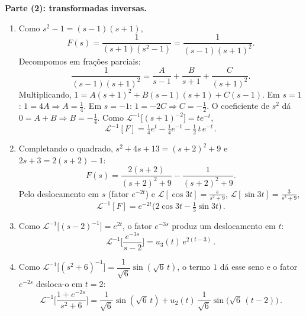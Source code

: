 \medskip
\noindent\textbf{Parte (2): transformadas inversas.}
\begin{enumerate}[label=(\alph*)]

\item Como $s^2-1=(s-1)(s+1)$,
\[
F(s)=\frac{1}{(s+1)(s^2-1)}=\frac{1}{(s-1)(s+1)^2}.
\]
Decompomos em frações parciais:
\[
\frac{1}{(s-1)(s+1)^2}=\frac{A}{s-1}+\frac{B}{s+1}+\frac{C}{(s+1)^2}.
\]
Multiplicando, $1=A(s+1)^2+B(s-1)(s+1)+C(s-1)$. Em $s=1$: $1=4A\Rightarrow A=\tfrac14$. Em $s=-1$: $1=-2C\Rightarrow C=-\tfrac12$. O coeficiente de $s^2$ dá $0=A+B\Rightarrow B=-\tfrac14$. Como $\mathcal{L}^{-1}\big[(s+1)^{-2}\big]=t e^{-t}$,
\[
\mathcal{L}^{-1}[F]=\boxed{\tfrac14 e^{t}-\tfrac14 e^{-t}-\tfrac12\,t\,e^{-t}}\,.
\]

\item Completando o quadrado, $s^2+4s+13=(s+2)^2+9$ e $2s+3=2(s+2)-1$:
\[
F(s)=\frac{2(s+2)}{(s+2)^2+9}-\frac{1}{(s+2)^2+9}.
\]
Pelo deslocamento em $s$ (fator $e^{-2t}$) e $\mathcal{L}[\cos 3t]=\tfrac{s}{s^2+9}$, $\mathcal{L}[\sin 3t]=\tfrac{3}{s^2+9}$,
\[
\mathcal{L}^{-1}[F]=\boxed{e^{-2t}\Big(2\cos 3t-\tfrac13\sin 3t\Big)}\,.
\]

\item Como $\mathcal{L}^{-1}\big[(s-2)^{-1}\big]=e^{2t}$, o fator $e^{-3s}$ produz um deslocamento em $t$:
\[
\mathcal{L}^{-1}\Big[\frac{e^{-3s}}{s-2}\Big]=\boxed{u_3(t)\,e^{2(t-3)}}\,.
\]

\item Como $\mathcal{L}^{-1}\big[(s^2+6)^{-1}\big]=\dfrac{1}{\sqrt6}\sin(\sqrt6\,t)$, o termo $1$ dá esse seno e o fator $e^{-2s}$ desloca-o em $t=2$:
\[
\mathcal{L}^{-1}\Big[\frac{1+e^{-2s}}{s^2+6}\Big]
=\boxed{\dfrac{1}{\sqrt6}\sin(\sqrt6\,t)+u_2(t)\,\dfrac{1}{\sqrt6}\sin\!\big(\sqrt6\,(t-2)\big)}\,.
\]

\end{enumerate}


